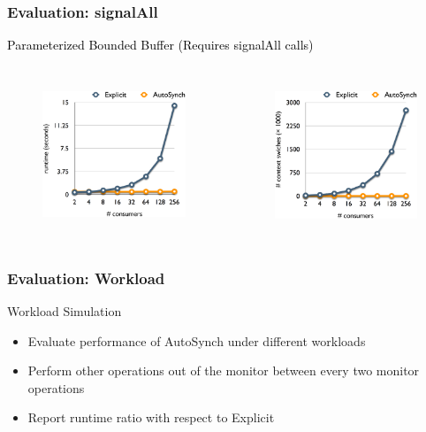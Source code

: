 \documentclass[mathserif,14pt,xcolor=table]{beamer}
\begin{document}
\begin{frame}
    \frametitle{Evaluation: signalAll}
    \textcolor{black}{Parameterized Bounded Buffer (Requires signalAll calls)}
    \begin{columns}[c]
            \begin{figure}[ht!]
                \centering
                \includegraphics[width=56mm]{fig/rpc.eps}
                \label{fig:rpc_eval}
            \end{figure}
            \begin{figure}[ht!]
                \centering
                \includegraphics[width=56mm]{fig/csrpc.eps}
            \label{fig:csrpc_eval}
            \end{figure}
    \end{columns}
\end{frame}

\begin{frame}
    \frametitle{Evaluation: Workload}
    Workload Simulation
    \begin{itemize}
        \item Evaluate performance of AutoSynch under different workloads
        \item Perform other operations out of the monitor between every two monitor
            operations
        \item Report runtime ratio with respect to Explicit
    \end{itemize}
\end{frame}
\end{document}
